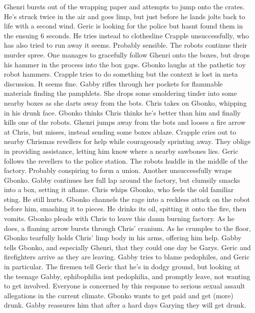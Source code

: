Ghenri bursts out of the wrapping paper and attempts to jump onto the crates. He’s struck twice in the air and goes limp, but just before he lands jolts back to life with a second wind.\medskip
Geric is looking for the police but hasnt found them in the ensuing 6 seconds. He tries instead to clothesline Crapple unsuccessfully, who has also tried to run away it seems. Probably sensible.\medskip
The robots continue their murder spree. One manages to gracefully follow Ghenri onto the boxes, but drops his hammer in the process into the box gaps. Gbonko laughs at the pathetic toy robot hammers.\medskip
Crapple tries to do something but the context is lost in meta discussion. It seems fine.\medskip
Gabby rifles through her pockets for flammable materials finding the pamphlets. She drops some smoldering tinder into some nearby boxes as she darts away from the bots.\medskip
Chris takes on Gbonko, whipping in his drunk face.\medskip
Gbonko thinks Chris thinks he’s better than him and finally kills one of the robots.\medskip
Ghenri jumps away from the bots and looses a fire arrow at Chris, but misses, instead sending some boxes ablaze.\medskip
Crapple cries out to nearby Chrismas revellers for help while courageously sprinting away. They oblige in providing assistance, letting him know where a nearby sawbones lies.\medskip
Geric follows the revellers to the police station.\medskip
The robots huddle in the middle of the factory. Probably conspiring to form a union. Another unsuccessfully wraps Gbonko.\medskip
Gabby continues her full lap around the factory, but clumsily smacks into a box, setting it aflame.\medskip
Chris whips Gbonko, who feels the old familiar sting. He still hurts.\medskip
Gbonko channels the rage into a reckless attack on the robot before him, smashing it to pieces. He drinks its oil, spitting it onto the fire, then vomits.\medskip
Gbonko pleads with Chris to leave this damn burning factory. As he does, a flaming arrow bursts through Chris’ cranium. As he crumples to the floor, Gbonko tearfully holds Chris’ limp body in his arms, offering him help.\medskip
Gabby tells Gbonko, and especially Ghenri, that they could one day be Garys.\medskip
Geric and firefighters arrive as they are leaving. Gabby tries to blame pedophiles, and Geric in particular. The firemen tell Geric that he’s in dodgy ground, but looking at the teenage Gabby, ephibophilia isnt pedophilia, and promptly leave, not wanting to get involved. Everyone is concerned by this response to serious sexual assault allegations in the current climate.\medskip
Gbonko wants to get paid and get (more) drunk. Gabby reassures him that after a hard days Garying they will get drunk.\medskip
